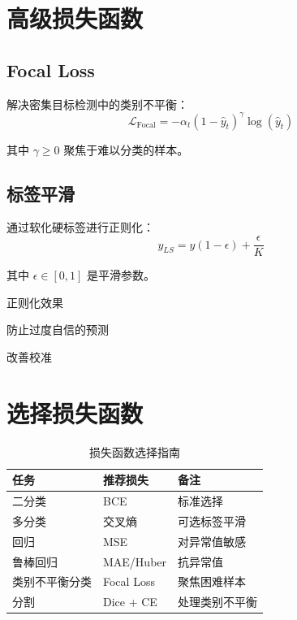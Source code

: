 \section{高级损失函数}

\subsection{Focal Loss}

解决密集目标检测中的类别不平衡：
\begin{equation}
\mathcal{L}_{\text{Focal}} = -\alpha_t (1 - \hat{y}_t)^\gamma \log(\hat{y}_t)
\end{equation}

其中 $\gamma \geq 0$ 聚焦于难以分类的样本。

\subsection{标签平滑}

通过软化硬标签进行正则化：
\begin{equation}
y_{LS} = y(1 - \epsilon) + \frac{\epsilon}{K}
\end{equation}

其中 $\epsilon \in [0, 1]$ 是平滑参数。

\begin{advantages}
    \item 正则化效果
    \item 防止过度自信的预测
    \item 改善校准
\end{advantages}

\section{选择损失函数}

\begin{table}[h]
    \centering
    \caption{损失函数选择指南}
    \begin{tabular}{L{2.5cm} L{4cm} L{4cm}}
        \toprule
        \textbf{任务} & \textbf{推荐损失} & \textbf{备注} \\
        \midrule
        二分类 & BCE & 标准选择 \\
        多分类 & 交叉熵 & 可选标签平滑 \\
        回归 & MSE & 对异常值敏感 \\
        鲁棒回归 & MAE/Huber & 抗异常值 \\
        类别不平衡分类 & Focal Loss & 聚焦困难样本 \\
        分割 & Dice + CE & 处理类别不平衡 \\
        \bottomrule
    \end{tabular}
\end{table}

